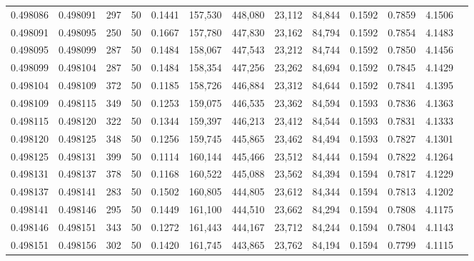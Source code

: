 \begin{tabular}{rrrrrrrrrrrrr}
0.498086 & 0.498091 & 297 &  50 &                                     0.1441 & 157,530 & 448,080 &  23,112 &  84,844 & 0.1592 & 0.7859 & 4.1506 \\
0.498091 & 0.498095 & 250 &  50 &                                     0.1667 & 157,780 & 447,830 &  23,162 &  84,794 & 0.1592 & 0.7854 & 4.1483 \\
0.498095 & 0.498099 & 287 &  50 &                                     0.1484 & 158,067 & 447,543 &  23,212 &  84,744 & 0.1592 & 0.7850 & 4.1456 \\
0.498099 & 0.498104 & 287 &  50 &                                     0.1484 & 158,354 & 447,256 &  23,262 &  84,694 & 0.1592 & 0.7845 & 4.1429 \\
0.498104 & 0.498109 & 372 &  50 &                                     0.1185 & 158,726 & 446,884 &  23,312 &  84,644 & 0.1592 & 0.7841 & 4.1395 \\
0.498109 & 0.498115 & 349 &  50 &                                     0.1253 & 159,075 & 446,535 &  23,362 &  84,594 & 0.1593 & 0.7836 & 4.1363 \\
0.498115 & 0.498120 & 322 &  50 &                                     0.1344 & 159,397 & 446,213 &  23,412 &  84,544 & 0.1593 & 0.7831 & 4.1333 \\
0.498120 & 0.498125 & 348 &  50 &                                     0.1256 & 159,745 & 445,865 &  23,462 &  84,494 & 0.1593 & 0.7827 & 4.1301 \\
0.498125 & 0.498131 & 399 &  50 &                                     0.1114 & 160,144 & 445,466 &  23,512 &  84,444 & 0.1594 & 0.7822 & 4.1264 \\
0.498131 & 0.498137 & 378 &  50 &                                     0.1168 & 160,522 & 445,088 &  23,562 &  84,394 & 0.1594 & 0.7817 & 4.1229 \\
0.498137 & 0.498141 & 283 &  50 &                                     0.1502 & 160,805 & 444,805 &  23,612 &  84,344 & 0.1594 & 0.7813 & 4.1202 \\
0.498141 & 0.498146 & 295 &  50 &                                     0.1449 & 161,100 & 444,510 &  23,662 &  84,294 & 0.1594 & 0.7808 & 4.1175 \\
0.498146 & 0.498151 & 343 &  50 &                                     0.1272 & 161,443 & 444,167 &  23,712 &  84,244 & 0.1594 & 0.7804 & 4.1143 \\
0.498151 & 0.498156 & 302 &  50 &                                     0.1420 & 161,745 & 443,865 &  23,762 &  84,194 & 0.1594 & 0.7799 & 4.1115 \\

\end{tabular}
